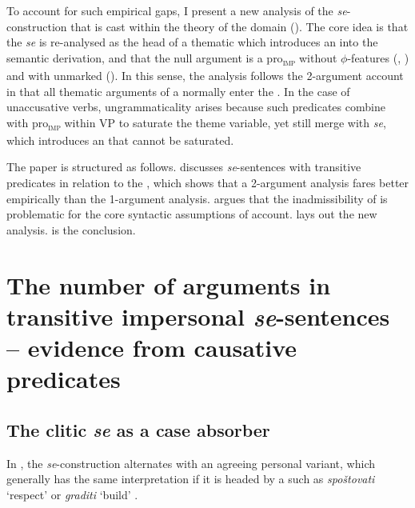 \documentclass[output=paper,nonflat,newtxmath]{langsci/langscibook}
\begin{document}
\largerpage[-1]
To account for such empirical gaps, I present a new analysis of the  \textit{se}-construction that is cast within the theory of the  domain (\citealt{schaffer2017}). The core idea is that the  \textit{se} is re-analysed as the head of a thematic  which introduces an  into the semantic derivation, and that the null argument is a pro\textsubscript{\textsc{imp}} without $\phi$-features (\citealt{Fenger2017}, \citealt{ackema2013, ackema2018})  and with unmarked  (\citealt{kornfilt2015}). In this sense, the analysis follows the 2-argument account in that all thematic arguments of a  normally enter the . In the case of unaccusative verbs, ungrammaticality arises because such predicates combine with pro\textsubscript{\textsc{imp}} within VP to saturate the theme variable, yet still merge with \textit{se}, which introduces an  that cannot be saturated.

The paper is structured as follows.  discusses  \textit{se}-sentences with transitive predicates in relation to the , which shows that a 2-argument analysis fares better empirically than the 1-argument analysis.  argues that the inadmissibility of  is problematic for the core syntactic assumptions of  account.  lays out the new analysis.  is the conclusion.

\section{The number of arguments in transitive impersonal \textit{se}-sentences – evidence from causative predicates} \label{sec2}

\subsection{The clitic \textit{se} as a case absorber}

In , the  \textit{se}-construction  alternates with an agreeing personal variant, which generally has the same interpretation if it is headed by a  such as \textit{spoštovati} `respect' or \textit{graditi} `build' .
\end{document}
